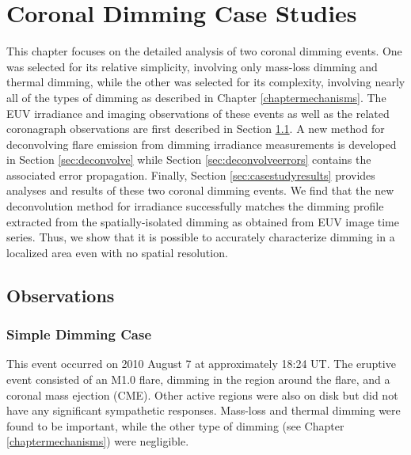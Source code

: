 \chapter{Coronal Dimming Case Studies}
\label{chaptercasestudy}

This chapter focuses on the detailed analysis of two coronal dimming events. One was selected for its relative simplicity, involving only mass-loss dimming and thermal dimming, while the other was selected for its complexity, involving nearly all of the types of dimming as described in Chapter \ref{chaptermechanisms}. The EUV irradiance and imaging observations of these events as well as the related coronagraph observations are first described in Section \ref{sec:observations}. A new method for deconvolving flare emission from dimming irradiance measurements is developed in Section \ref{sec:deconvolve} while Section \ref{sec:deconvolveerrors} contains the associated error propagation. Finally, Section \ref{sec:casestudyresults} provides analyses and results of these two coronal dimming events. We find that the new deconvolution method for irradiance successfully matches the dimming profile extracted from the spatially-isolated dimming as obtained from EUV image time series. Thus, we show that it is possible to accurately characterize dimming in a localized area even with no spatial resolution. 

\section{Observations}
\label{sec:observations}

\subsection{Simple Dimming Case}
This event occurred on 2010 August 7 at approximately 18:24 UT. The eruptive event consisted of an M1.0 flare, dimming in the region around the flare, and a coronal mass ejection (CME). Other active regions were also on disk but did not have any significant sympathetic responses. Mass-loss and thermal dimming were found to be important, while the other type of dimming (see Chapter \ref{chaptermechanisms}) were negligible. 


